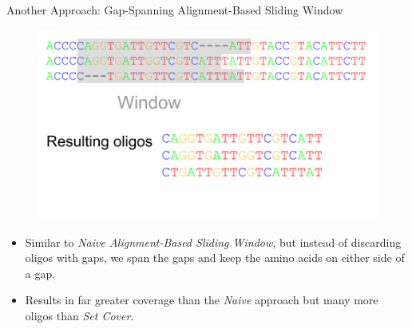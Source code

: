 \documentclass[final]{beamer}
\newlength{\colwidth}
\begin{document}
\begin{frame}[t]
\begin{columns}[t]
\begin{column}{\colwidth}
  \begin{block}{Another Approach: Gap-Spanning Alignment-Based Sliding Window}
    \begin{figure}
      \includegraphics[width=0.8\colwidth]{figures/gap_spanning.png}
    \end{figure}

    \begin{itemize}
    \item Similar to \emph{Naive Alignment-Based Sliding Window}, but instead of discarding oligos with gaps,
          we span the gaps and keep the amino acids on either side of a gap.
      \item Results in far greater coverage than the \emph{Naive} approach but many more oligos than \emph{Set Cover}.
    \end{itemize}
  \end{block}


\end{column}
\end{columns}
\end{frame}
\end{document}
